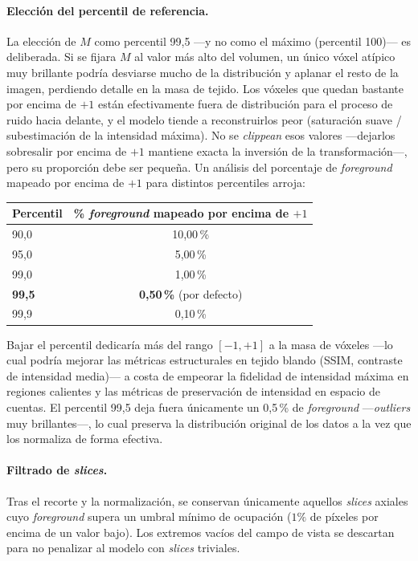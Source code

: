 \paragraph{Elección del percentil de referencia.}
La elección de $M$ como percentil 99,5 —y no como el máximo
(percentil 100)— es deliberada. Si se fijara $M$ al valor más alto
del volumen, un único vóxel atípico muy brillante podría
desviarse mucho de la distribución y aplanar el resto de la
imagen, perdiendo detalle en la masa de tejido. Los vóxeles que quedan bastante
por encima de $+1$ están efectivamente fuera de distribución para
el proceso de ruido hacia delante, y el modelo tiende a
reconstruirlos peor (saturación suave / subestimación de la
intensidad máxima). No se \textit{clippean} esos valores —dejarlos
sobresalir por encima de $+1$ mantiene exacta la inversión de la
transformación—, pero su proporción debe ser pequeña. Un análisis
del porcentaje de \textit{foreground} mapeado por encima de $+1$
para distintos percentiles arroja:
\begin{center}
\begin{tabular}{lc}
\toprule
Percentil & \% \textit{foreground} mapeado por encima de $+1$ \\
\midrule
90{,}0 & 10{,}00\,\% \\
95{,}0 & 5{,}00\,\% \\
99{,}0 & 1{,}00\,\% \\
\textbf{99{,}5} & \textbf{0{,}50\,\%} (por defecto) \\
99{,}9 & 0{,}10\,\% \\
\bottomrule
\end{tabular}
\end{center}
Bajar el percentil dedicaría más del rango $[-1, +1]$ a la masa
de vóxeles —lo cual podría mejorar las métricas estructurales en
tejido blando (SSIM, contraste de intensidad media)— a costa de
empeorar la fidelidad de intensidad máxima en regiones calientes
y las métricas de preservación de intensidad en espacio de
cuentas. El percentil 99,5 deja fuera únicamente un 0,5\,\% de
\textit{foreground} —\textit{outliers} muy brillantes—, lo cual
preserva la distribución original de los datos a la vez que los
normaliza de forma efectiva.

\paragraph{Filtrado de \textit{slices}.}
Tras el recorte y la normalización, se conservan únicamente
aquellos \textit{slices} axiales cuyo \textit{foreground} supera
un umbral mínimo de ocupación ($1\%$ de píxeles por encima de un
valor bajo). Los extremos vacíos del campo de vista se descartan para no
penalizar al modelo con \textit{slices} triviales.

